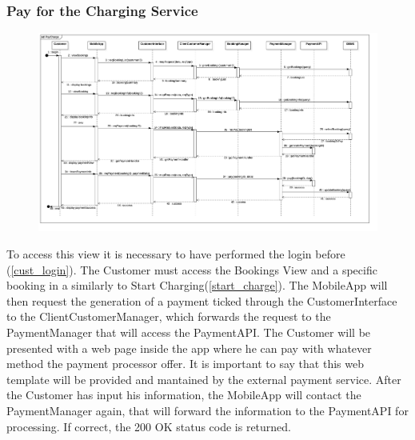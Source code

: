 \subsubsection{Pay for the Charging Service}
\begin{figure}[H]
    \begin{center}
        \includegraphics[width=\textwidth]{img/runtime/pay_charging}
    \end{center}
\end{figure}
To access this view it is necessary to have performed the login before (\ref{cust_login}). The Customer must access the Bookings View and a specific booking in a similarly to Start Charging(\ref{start_charge}). The MobileApp will then request the generation of a payment ticked through the CustomerInterface to the ClientCustomerManager, which forwards the request to the PaymentManager that will access the PaymentAPI. The Customer will be presented with a web page inside the app where he can pay with whatever method the payment processor offer. It is important to say that this web template will be provided and mantained by the external payment service. After the Customer has input his information, the MobileApp will contact the PaymentManager again, that will forward the information to the PaymentAPI for processing. If correct, the 200 OK status code is returned.
